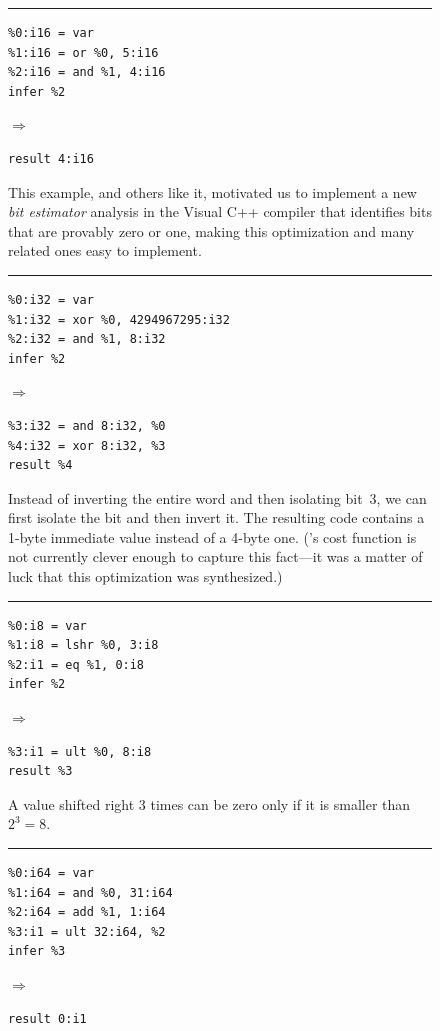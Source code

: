 \newcommand{\myrule}{\vskip0.15in\hrule\vskip0.10in}

\begin{figure}

{\small

\begin{minipage}[t]{0.31\textwidth}

\myrule

{\begin{verbatim}
%0:i16 = var
%1:i16 = or %0, 5:i16
%2:i16 = and %1, 4:i16
infer %2
\end{verbatim}}
$\Rightarrow$
{\begin{verbatim}
result 4:i16
\end{verbatim}}

This example, and others like it, motivated us to implement a new
\emph{bit estimator} analysis in the Visual C++ compiler that identifies bits that are
provably zero or one, making this optimization and many related ones
easy to implement.

\myrule

{\begin{verbatim}
%0:i32 = var
%1:i32 = xor %0, 4294967295:i32
%2:i32 = and %1, 8:i32
infer %2
\end{verbatim}}
$\Rightarrow$
{\begin{verbatim}
%3:i32 = and 8:i32, %0
%4:i32 = xor 8:i32, %3
result %4
\end{verbatim}}

Instead of inverting the entire word and then isolating bit~3, we can
first isolate the bit and then invert it.
%
The resulting code contains a 1-byte immediate value instead of a
4-byte one.
%
(\tool{}'s cost function is not currently clever enough to capture
this fact---it was a matter of luck that this optimization was
synthesized.)

\myrule{
\begin{verbatim}
%0:i8 = var
%1:i8 = lshr %0, 3:i8
%2:i1 = eq %1, 0:i8
infer %2
\end{verbatim}}
$\Rightarrow$
{\begin{verbatim}
%3:i1 = ult %0, 8:i8
result %3
\end{verbatim}}

A value shifted right 3 times can be zero only if it is smaller than $2^3 = 8$.

\end{minipage}
%
\hspace{0.035\textwidth}
%
\begin{minipage}[t]{0.31\textwidth}
\myrule
{\begin{verbatim}
%0:i64 = var
%1:i64 = and %0, 31:i64
%2:i64 = add %1, 1:i64
%3:i1 = ult 32:i64, %2
infer %3
\end{verbatim}}
$\Rightarrow$
{\begin{verbatim}
result 0:i1
\end{verbatim}}


\end{minipage}}
\end{figure}
